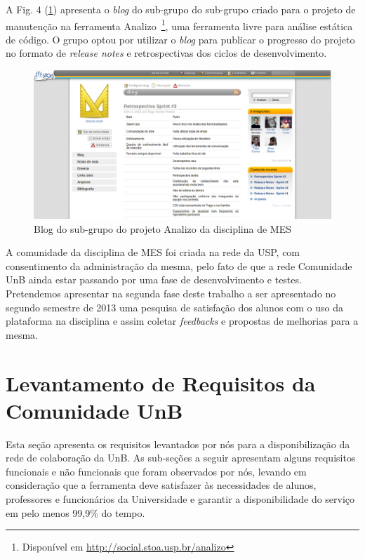 A Fig. 4 (\ref{analizo}) apresenta o \textit{blog} do sub-grupo do sub-grupo
criado para o projeto de manutenção na ferramenta Analizo~\footnote{Disponível
em \url{http://social.stoa.usp.br/analizo}}, uma ferramenta livre
para análise estática de código. O grupo optou por utilizar o \textit{blog}
para publicar o progresso do projeto no formato de \textit{release notes} e
retrospectivas dos ciclos de desenvolvimento.

\begin{figure}[h]
	\centering
	\label{analizo}
		\includegraphics[keepaspectratio=true,scale=0.3]
		{figuras/analizo.eps}
	\caption{Blog do sub-grupo do projeto Analizo da disciplina de MES }
\end{figure}

A comunidade da disciplina de MES foi criada na rede da USP, com consentimento
da administração da mesma, pelo fato de que a rede Comunidade UnB ainda estar
passando por uma fase de desenvolvimento e testes. Pretendemos apresentar
na segunda fase deste trabalho a ser apresentado no segundo semestre de 2013
uma pesquisa de satisfação dos alunos com o uso da plataforma na disciplina e
assim coletar \textit{feedbacks} e propostas de melhorias para a mesma. 


\section{Levantamento de Requisitos da Comunidade UnB}

Esta seção apresenta os requisitos levantados por nós para a disponibilização
da rede de colaboração da UnB. As sub-seções a seguir apresentam alguns
requisitos funcionais e não funcionais que foram observados por nós, levando
em consideração que a ferramenta deve satisfazer às necessidades de alunos,
professores e funcionários da Universidade e garantir a disponibilidade do
serviço em pelo menos 99,9\% do tempo.

